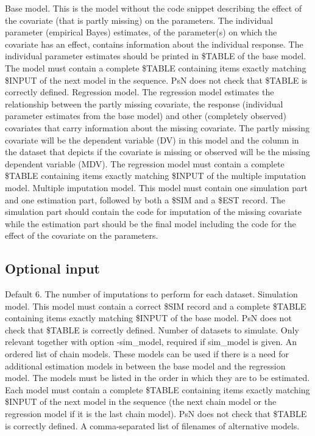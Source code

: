 \begin{optionlist}
Base model. This is the model without the code snippet describing the effect of the covariate (that is partly missing) on the parameters. The individual parameter (empirical Bayes) estimates, of the parameter(s) on which the covariate has an effect, contains information about the individual response. The individual parameter estimates should be printed in \$TABLE of the base model. The model must contain a complete \$TABLE containing items exactly matching \$INPUT of the next model in the sequence. PsN does not check that \$TABLE is correctly defined.  
\nextopt
{}
Regression model.  The regression model estimates the relationship between the partly missing covariate, the response (individual parameter estimates from the base model) and other (completely observed) covariates that carry information about the missing covariate. The partly missing covariate will be the dependent variable (DV) in this model and the column in the dataset that depicts if the covariate is missing or observed will be the missing dependent variable (MDV). The regression model must contain a complete \$TABLE containing items exactly matching \$INPUT of the multiple imputation model. 
\nextopt
{}
Multiple imputation model. This model must contain one simulation part and one estimation part, followed by both a \$SIM and a \$EST record. The simulation part should contain the code for imputation of the missing covariate while the estimation part should be the final model including the code for the effect of the covariate on the parameters. 
\nextopt
\end{optionlist}

\subsection{Optional input}

\begin{optionlist}
Default 6. The number of imputations to perform for each dataset. 
\nextopt
{}
Simulation model. This model must contain a correct \$SIM record and a complete \$TABLE containing items exactly matching \$INPUT of the base model. PsN does not check that \$TABLE is correctly defined. 
\nextopt
{}
Number of datasets to simulate. Only relevant together with option -sim\_model, required if sim\_model is given. 
\nextopt
{}
An ordered list of chain models. These models can be used if there is a need for additional estimation models in between the base model and the regression model. The models must be listed in the order in which they are to be estimated. Each model must contain a complete \$TABLE containing items exactly matching \$INPUT of the next model in the sequence (the next chain model or the regression model if it is the last chain model). PsN does not check that \$TABLE is correctly defined.   
\nextopt
{}
A comma-separated list of filenames of alternative models. 
\nextopt
\end{optionlist}


